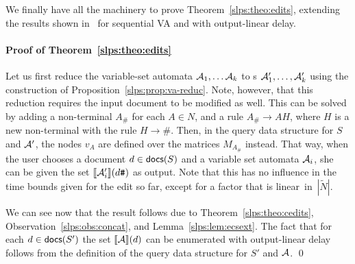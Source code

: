 We finally have all the machinery to prove Theorem~\ref{slps:theo:edits}, extending the results shown in~\cite{SchmidS22} for sequential VA and with output-linear delay.

\paragraph{Proof of Theorem~\ref{slps:theo:edits}} Let us first reduce the variable-set automata $\mathcal{A}_1, \ldots \mathcal{A}_k$ to \crt{}s $\mathcal{A}_1',\ldots,\mathcal{A}_k'$ using the construction of Proposition~\ref{slps:prop:va-reduc}. Note, however, that this reduction requires the input document to be modified as well. This can be solved by adding a non-terminal $A_{\texttt{\#}}$ for each $A\in N$, and a rule $A_{\texttt{\#}}\to AH$, where $H$ is a new non-terminal with the rule $H\to\texttt{\#}$. Then, in the query data structure for $S$ and $\mathcal{A}'$, the nodes $v_A$ are defined over the matrices $M_{A_{\texttt{\#}}}$ instead. That way, when the user chooses a document $d\in \textsf{docs}(S)$ and a variable set automata $\mathcal{A}_i$, she can be given the set ${\llbracket{\mathcal{A}'_i}\rrbracket}(d\texttt{\#})$ as output. Note that this has no influence in the time bounds given for the edit so far, except for a factor that is linear~in~$|\tilde{N}|$.

We can see now that the result follows due to Theorem~\ref{slps:theo:cedits}, Observation~\ref{slps:obs:concat}, and Lemma~\ref{slps:lem:ecsext}. The fact that for each $d\in \textsf{docs}(S')$ the set ${\llbracket{\mathcal{A}}\rrbracket}(d)$ can be enumerated with output-linear delay follows from the definition of the query data structure for $S'$ and $\mathcal{A}$. \qed
